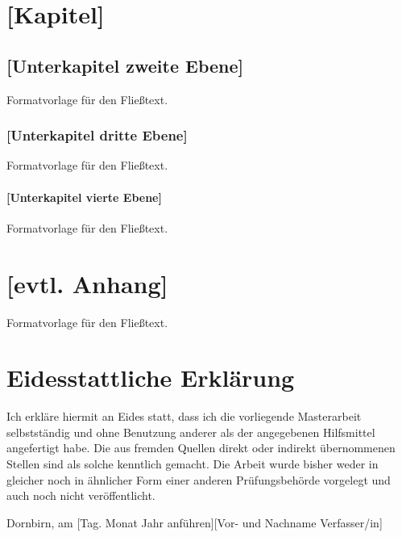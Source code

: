 \documentclass[a4paper,12pt,twoside]{scrreprt}
\begin{document}
\chapter{[Kapitel]}

\section{[Unterkapitel zweite Ebene]}
Formatvorlage für den Fließtext.

\subsection{[Unterkapitel dritte Ebene]}
Formatvorlage für den Fließtext.

\subsubsection{[Unterkapitel vierte Ebene]}
Formatvorlage für den Fließtext.


\clearpage
{}
{}
\printbibliography


\chapter*{[evtl. Anhang]}  %
Formatvorlage für den Fließtext.


\chapter*{Eidesstattliche Erklärung}
Ich erkläre hiermit an Eides statt, dass ich die vorliegende Masterarbeit selbstständig und ohne Benutzung anderer als der angegebenen Hilfsmittel angefertigt habe. Die aus fremden Quellen direkt oder indirekt übernommenen Stellen sind als solche kenntlich gemacht. Die Arbeit wurde bisher weder in gleicher noch in ähnlicher Form einer anderen Prüfungsbehörde vorgelegt und auch noch nicht veröffentlicht.

\vspace{3cm}
\noindent
Dornbirn, am [Tag. Monat Jahr anführen]\hfill [Vor- und Nachname Verfasser/in]
\end{document}
